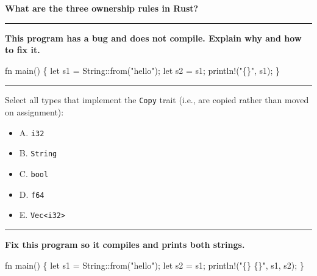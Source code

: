 \documentclass[
  11pt,
]{article}
\newenvironment{Shaded}{}{}
\newcommand{\NormalTok}[1]{#1}
\providecommand{\tightlist}{%
  \setlength{\itemsep}{0pt}\setlength{\parskip}{0pt}}
\begin{document}
\textbf{What are the three ownership rules in Rust?}

\begin{center}\rule{0.5\linewidth}{0.5pt}\end{center}

\textbf{This program has a bug and does not compile. Explain why and how
to fix it.}

\begin{Shaded}
\begin{Highlighting}[]
\NormalTok{fn main() \{}
\NormalTok{    let s1 = String::from("hello");}
\NormalTok{    let s2 = s1;}
\NormalTok{    println!("\{\}", s1);}
\NormalTok{\}}
\end{Highlighting}
\end{Shaded}

\begin{center}\rule{0.5\linewidth}{0.5pt}\end{center}

Select all types that implement the \texttt{Copy} trait (i.e., are
copied rather than moved on assignment):

\begin{itemize}
\tightlist
\item[$\square$]
  A. \texttt{i32}
\item[$\square$]
  B. \texttt{String}
\item[$\square$]
  C. \texttt{bool}
\item[$\square$]
  D. \texttt{f64}
\item[$\square$]
  E. \texttt{Vec\textless{}i32\textgreater{}}
\end{itemize}

\begin{center}\rule{0.5\linewidth}{0.5pt}\end{center}

\textbf{Fix this program so it compiles and prints both strings.}

\begin{Shaded}
\begin{Highlighting}[]
\NormalTok{fn main() \{}
\NormalTok{    let s1 = String::from("hello");}
\NormalTok{    let s2 = s1;}
\NormalTok{    println!("\{\} \{\}", s1, s2);}
\NormalTok{\}}
\end{Highlighting}
\end{Shaded}

\begin{Shaded}
\begin{Highlighting}[]

\end{Highlighting}
\end{Shaded}
\end{document}
